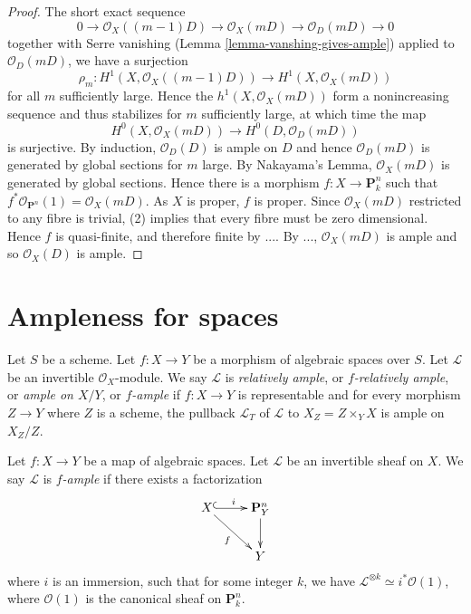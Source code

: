 \begin{proof}
The short exact sequence
$$
0 \longrightarrow \mathcal{O}_X((m-1)D) \longrightarrow \mathcal{O}_X(mD)
\longrightarrow \mathcal{O}_D(mD) \longrightarrow 0
$$
together with Serre vanishing (Lemma \ref{lemma-vanshing-gives-ample}) applied to $\mathcal{O}_D(mD)$,
we have a surjection
$$
\rho_m : H^1(X,\mathcal{O}_X((m -1)D)) \longrightarrow H^1(X,\mathcal{O}_X(mD))
$$
for all $m$ sufficiently large.
Hence the $h^1(X,\mathcal{O}_X(mD))$ form a nonincreasing sequence and thus
stabilizes for $m$ sufficiently large, at which time the map
$$
H^0(X,\mathcal{O}_X(mD)) \longrightarrow H^0(D,\mathcal{O}_D(mD))
$$
is surjective.
By induction, $\mathcal{O}_D(D)$ is ample on $D$ and hence $\mathcal{O}_D(mD)$
is generated by global sections for $m$ large.
By Nakayama's Lemma, $\mathcal{O}_X(mD)$ is generated by global sections.
Hence there is a morphism $f : X \to \mathbf{P}^n_k$ such that
$f^*\mathcal{O}_{\mathbf{P}^n}(1) = \mathcal{O}_X(mD)$.
As $X$ is proper, $f$ is proper.
Since $\mathcal{O}_X(mD)$ restricted to any fibre is trivial, (2) implies that
every fibre must be zero dimensional.
Hence $f$ is quasi-finite, and therefore finite by ....
By ..., $\mathcal{O}_X(mD)$ is ample
and so $\mathcal{O}_X(D)$ is ample.
\end{proof}

\section{Ampleness for spaces}
\begin{definition}
Let $S$ be a scheme.
Let $f : X \to Y$ be a morphism of algebraic spaces over $S$.
Let $\mathcal{L}$ be an invertible $\mathcal{O}_X$-module.
We say $\mathcal{L}$ is {\it relatively ample}, or {\it $f$-relatively ample},
or {\it ample on $X/Y$}, or {\it $f$-ample} if $f : X \to Y$
is representable and for every morphism $Z \to Y$
where $Z$ is a scheme, the pullback $\mathcal{L}_T$ of $\mathcal{L}$
to $X_Z = Z \times_Y X$ is ample on $X_Z/Z$.
\end{definition}

\begin{definition}[{\cite[II, Def.\ 7.9]{Kn}}]\label{definition-knutson-ample}
  Let $f : X \to Y$ be a map of algebraic spaces. Let $\mathcal{L}$ be an
  invertible sheaf on $X$. We say $\mathcal{L}$ is {\it $f$-ample} if there
  exists a factorization
  $$
  \xymatrix{
    X \ar@{^{(}->}[r]^i\ar[dr]_f & \mathbf{P}^n_Y \ar[d]\\
    & Y
  }
  $$
  where $i$ is an immersion, such that for some integer $k$, we have
  $\mathcal{L}^{\otimes k} \simeq i^*\mathcal{O}(1)$, where $\mathcal{O}(1)$ is
  the canonical sheaf on $\mathbf{P}^n_k$.
\end{definition}

